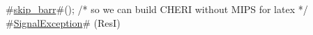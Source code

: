 #\hyperref[sailMIPSzskipzybarr]{skip\_barr}#(); /* so we can build CHERI without MIPS for latex  */
#\hyperref[sailMIPSzSignalException]{SignalException}# (ResI)
